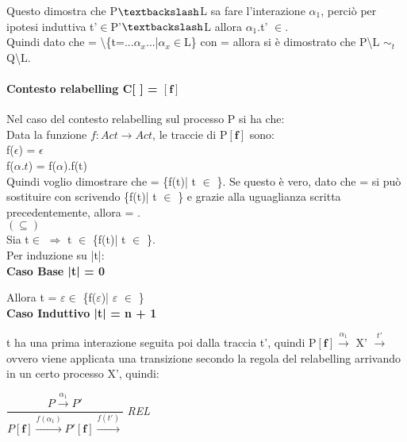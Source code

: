 Questo dimostra che P$\textbackslash$L sa fare l'interazione $\alpha_{1}$, perciò per ipotesi induttiva t'$\in$P'$\textbackslash$L allora $\alpha_{1}$.t' $\in$.
\\

Quindi dato che  = \textbackslash \{t=...$\alpha_{x}$...|$\alpha_{x}\in$L\} con  =   allora si è dimostrato che  P\textbackslash L $\sim_{t}$ Q\textbackslash L.

\paragraph{Contesto relabelling  C[ ] = $\mathbf{[f]}$ } \mbox{}

Nel caso del contesto relabelling sul processo P si ha che:	\\	
Data la funzione $f: Act \rightarrow Act$, le traccie di P$\mathbf{[f]}$ sono:\\
f($\epsilon$) = $\epsilon$\\
f($\alpha.t$) =  f($\alpha$).f(t)\\
Quindi voglio dimostrare che  = \{f(t)| t $\in$ \}. Se questo è vero, dato che  =   si può sostituire  con  scrivendo \{f(t)| t $\in$ \} e grazie alla uguaglianza scritta precedentemente, allora  = . \\

$(\subseteq)$ \\

Sia t$\in$  $\Rightarrow$ t $\in$ \{f(t)| t $\in$ \}. \\
Per induzione su |t|:
\\

\textbf{Caso Base |t| = 0}

Allora t = $\varepsilon \in$ \{f($\varepsilon$)| $\varepsilon$ $\in$ \}\\


\textbf{Caso Induttivo |t| = n + 1}

t ha una prima interazione seguita poi dalla traccia t', quindi P$\mathbf{[f]}  \overset{\alpha_{1}}\rightarrow $ X' $\overset{t'}\rightarrow$ ovvero viene applicata una transizione secondo la regola del relabelling arrivando in un certo processo X', quindi:

$\dfrac{P \overset{\alpha_{1}}\rightarrow P'}{P \mathbf{[f]} \overset{f(\alpha_{1})}\rightarrow P'\mathbf{[f]}\overset{f(t')}\rightarrow}$ \textit{REL} 

